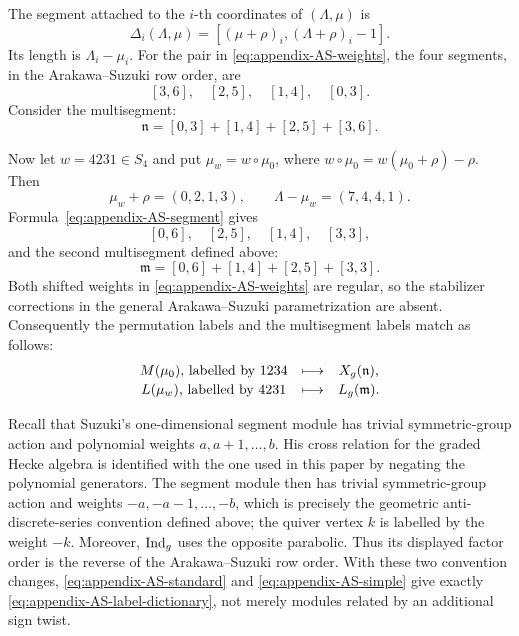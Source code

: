 \documentclass[10pt,a4paper]{amsart}
\begin{document}
The segment attached to the $i$-th coordinates of $(\Lambda,\mu)$ is
\begin{equation}\label{eq:appendix-AS-segment}
 \Delta_i(\Lambda,\mu)
 =[(\mu+\rho)_i,(\Lambda+\rho)_i-1].
\end{equation}
Its length is $\Lambda_i-\mu_i$.  For the pair in
\eqref{eq:appendix-AS-weights}, the four segments, in the
Arakawa--Suzuki row order, are
\[
 [3,6],\quad[2,5],\quad[1,4],\quad[0,3].
\]
Consider the multisegment:
\[
 \mathfrak n=[0,3]+[1,4]+[2,5]+[3,6].
\]

Now let $w=4231\in S_4$ and put $\mu_w=w\circ\mu_0$, where
$w\circ\mu_0=w(\mu_0+\rho)-\rho$.  Then
\[
 \mu_w+\rho=(0,2,1,3),
 \qquad
 \Lambda-\mu_w=(7,4,4,1).
\]
Formula~\eqref{eq:appendix-AS-segment} gives
\[
 [0,6],\quad[2,5],\quad[1,4],\quad[3,3],
\]
and the second multisegment defined above:
\[
 \mathfrak m=[0,6]+[1,4]+[2,5]+[3,3].
\]
Both shifted weights in \eqref{eq:appendix-AS-weights} are regular, so the
stabilizer corrections in the general Arakawa--Suzuki parametrization are
absent.  Consequently the permutation labels and the multisegment labels
match as follows:
\begin{equation}\label{eq:appendix-AS-label-dictionary}
 \begin{array}{c@{\quad\longmapsto\quad}c}
  M(\mu_0)\text{, labelled by }1234&X_{\rm g}(\mathfrak n),\\[2pt]
  L(\mu_w)\text{, labelled by }4231&L_{\rm g}(\mathfrak m).
 \end{array}
\end{equation}

Recall that  Suzuki's one-dimensional segment
module has trivial symmetric-group action and polynomial weights
$a,a+1,\ldots,b$.  His cross relation for the graded Hecke algebra is identified with the one used in
this paper by negating the polynomial generators.  The segment module then
has trivial symmetric-group action and weights
$-a,-a-1,\ldots,-b$, which is precisely the geometric
anti-discrete-series convention defined above; the quiver vertex $k$ is
labelled by
the weight $-k$.  Moreover, $\operatorname{Ind}_{\rm g}$ uses the opposite
parabolic.  Thus its displayed factor order is the reverse of the
Arakawa--Suzuki row order.  With these two convention changes,
\eqref{eq:appendix-AS-standard} and
\eqref{eq:appendix-AS-simple} give exactly
\eqref{eq:appendix-AS-label-dictionary}, not merely modules related by an
additional sign twist.
\end{document}
